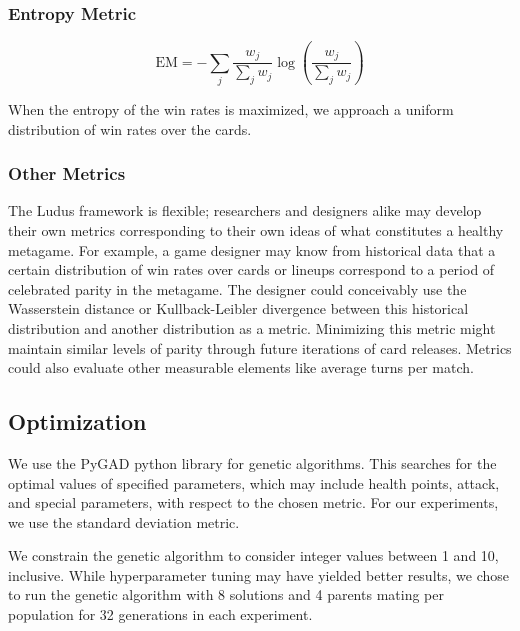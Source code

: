\documentclass[letterpaper]{article} %
\begin{document}
\subsubsection{Entropy Metric}

\begin{equation}
	\mathrm{EM} = -\sum_j \frac{w_j}{\sum_j w_j} \log\left(\frac{w_j}{\sum_j w_j}\right)
\end{equation}

When the entropy of the win rates is maximized, we approach a uniform
distribution of win rates over the cards.

\subsubsection{Other Metrics} \label{sec:othermetrics}

The {\sc Ludus} framework is flexible; researchers and designers alike may develop their own metrics corresponding to their
own ideas of what constitutes a healthy metagame. For example, a game designer may know from historical data that
a certain distribution of win rates over cards or lineups correspond to a period of celebrated parity in the metagame. 
The designer could conceivably use the Wasserstein distance or Kullback-Leibler 
divergence between this historical distribution and another distribution as a metric. Minimizing this metric 
might maintain similar levels of parity through future iterations of card releases.
Metrics could also evaluate other measurable elements like average turns per match.

\subsection{Optimization} \label{sec:optimization}

We use the PyGAD python library \cite{gad2021pygad} for genetic %
algorithms. This searches for the optimal values of
specified parameters, which may include health points, attack, and special parameters, with respect to %
the chosen metric. For our experiments, we use the standard deviation metric.

We constrain the genetic algorithm to consider integer values between 1 and 10, inclusive. While hyperparameter tuning may have yielded better results,
we chose to run the genetic algorithm with 8 solutions and 4 parents mating per population for 32 generations in each experiment.
\end{document}
